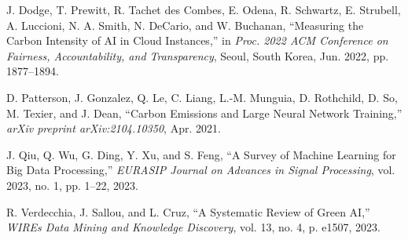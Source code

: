 \documentclass[10pt,journal,compsoc]{IEEEtran}
\begin{document}
\begin{thebibliography}{40}
J. Dodge, T. Prewitt, R. Tachet des Combes, E. Odena, R. Schwartz, E. Strubell, A. Luccioni, N. A. Smith, N. DeCario, and W. Buchanan, ``Measuring the Carbon Intensity of AI in Cloud Instances,'' in \textit{Proc. 2022 ACM Conference on Fairness, Accountability, and Transparency}, Seoul, South Korea, Jun. 2022, pp. 1877--1894.

D. Patterson, J. Gonzalez, Q. Le, C. Liang, L.-M. Munguia, D. Rothchild, D. So, M. Texier, and J. Dean, ``Carbon Emissions and Large Neural Network Training,'' \textit{arXiv preprint arXiv:2104.10350}, Apr. 2021.

J. Qiu, Q. Wu, G. Ding, Y. Xu, and S. Feng, ``A Survey of Machine Learning for Big Data Processing,'' \textit{EURASIP Journal on Advances in Signal Processing}, vol. 2023, no. 1, pp. 1--22, 2023.

R. Verdecchia, J. Sallou, and L. Cruz, ``A Systematic Review of Green AI,'' \textit{WIREs Data Mining and Knowledge Discovery}, vol. 13, no. 4, p. e1507, 2023.

\end{thebibliography}
\end{document}
